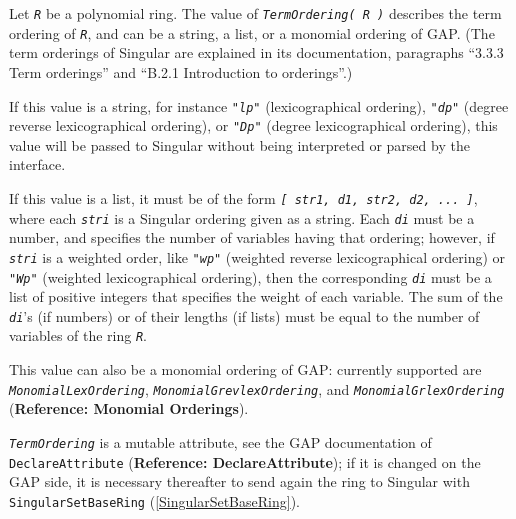 \documentclass[a4paper,11pt]{report}
\begin{document}
{{{ Let \mbox{\texttt{\mdseries\slshape R}} be a polynomial ring. The value of \mbox{\texttt{\mdseries\slshape TermOrdering( R )}} describes the term ordering of \mbox{\texttt{\mdseries\slshape R}}, and can be a string, a list, or a monomial ordering of \textsf{GAP}. (The term orderings of \textsf{Singular} are explained in its documentation, paragraphs ``3.3.3 Term orderings'' and
``B.2.1 Introduction to orderings''.) 

 If this value is a string, for instance \mbox{\texttt{\mdseries\slshape "lp"}} (lexicographical ordering), \mbox{\texttt{\mdseries\slshape "dp"}} (degree reverse lexicographical ordering), or \mbox{\texttt{\mdseries\slshape "Dp"}} (degree lexicographical ordering), this value will be passed to \textsf{Singular} without being interpreted or parsed by the interface. 

 If this value is a list, it must be of the form \mbox{\texttt{\mdseries\slshape [ str{\textunderscore}1, d{\textunderscore}1, str{\textunderscore}2,
d{\textunderscore}2, ... ]}}, where each \mbox{\texttt{\mdseries\slshape str{\textunderscore}i}} is a \textsf{Singular} ordering given as a string. Each \mbox{\texttt{\mdseries\slshape d{\textunderscore}i}} must be a number, and specifies the number of variables having that ordering;
however, if \mbox{\texttt{\mdseries\slshape str{\textunderscore}i}} is a weighted order, like \mbox{\texttt{\mdseries\slshape "wp"}} (weighted reverse lexicographical ordering) or \mbox{\texttt{\mdseries\slshape "Wp"}} (weighted lexicographical ordering), then the corresponding \mbox{\texttt{\mdseries\slshape d{\textunderscore}i}} must be a list of positive integers that specifies the weight of each
variable. The sum of the \mbox{\texttt{\mdseries\slshape d{\textunderscore}i}}'s (if numbers) or of their lengths (if lists) must be equal to the number of
variables of the ring \mbox{\texttt{\mdseries\slshape R}}. 

 This value can also be a monomial ordering of \textsf{GAP}: currently supported are \mbox{\texttt{\mdseries\slshape MonomialLexOrdering}}, \mbox{\texttt{\mdseries\slshape MonomialGrevlexOrdering}}, and \mbox{\texttt{\mdseries\slshape MonomialGrlexOrdering}}  (\textbf{Reference: Monomial Orderings}). 

 \mbox{\texttt{\mdseries\slshape TermOrdering}} is a mutable attribute, see the \textsf{GAP} documentation of \texttt{DeclareAttribute} (\textbf{Reference: DeclareAttribute}); if it is changed on the \textsf{GAP} side, it is necessary thereafter to send again the ring to \textsf{Singular} with \texttt{SingularSetBaseRing} (\ref{SingularSetBaseRing}). 

}}}
\end{document}
